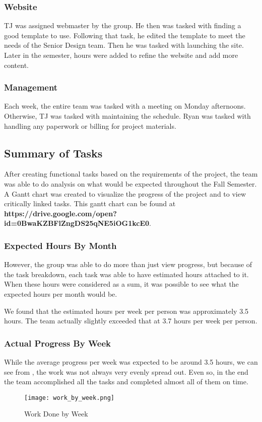 \documentclass[PPFS.tex]{template/subfiles}
\begin{document}
\subsubsection{Website}
TJ was assigned webmaster by the group. He then was tasked with finding a good template to use. Following that task, he edited the template to meet the needs of the Senior Design team. Then he was tasked with launching the site. Later in the semester, hours were added to refine the website and add more content.

\subsubsection{Management}
Each week, the entire team was tasked with a meeting on Monday afternoons. Otherwise, TJ was tasked with maintaining the schedule. Ryan was tasked with handling any paperwork or billing for project materials.


\subsection{Summary of Tasks}
After creating functional tasks based on the requirements of the project, the team was able to do analysis on what would be expected throughout the Fall Semester. A Gantt chart was created to visualize the progress of the project and to view critically linked tasks.
This gantt chart can be found at \textbf{https://drive.google.com/open?id=0BwaKZBFlZngDS25qNE5iOG1kcE0}.

\subsubsection{Expected Hours By Month}
However, the group was able to do more than just view progress, but because of the task breakdown, each task was able to have estimated hours attached to it. When these hours were considered as a sum, it was possible to see what the expected hours per month would be.

We found that the estimated hours per week per person was approximately 3.5 hours. The team actually slightly exceeded that at 3.7 hours per week per person.

\subsubsection{Actual Progress By Week}

While the average progress per week was expected to be around 3.5 hours, we can see from , the work was not always very evenly spread out. Even so, in the end the team accomplished all the tasks and completed almost all of them on time.

\begin{figure}[H]
    \centering
    \texttt{[image: work\_by\_week.png]}
    \caption{Work Done by Week}
    \label{fig:work_by_week}
\end{figure}
\end{document}
